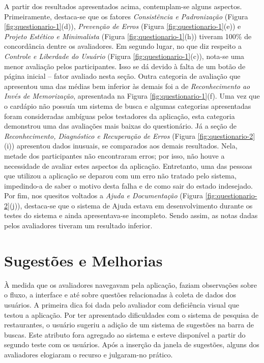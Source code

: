 A partir dos resultados apresentados acima, contemplam-se alguns aspectos. Primeiramente, destaca-se que os fatores \textit{Consistência e Padronização} (Figura \ref{fig:questionario-1}(d)), \textit{Prevenção de Erros} (Figura \ref{fig:questionario-1}(e)) e \textit{Projeto Estético e Minimalista} (Figura \ref{fig:questionario-1}(h)) tiveram 100\% de concordância dentre os avaliadores. Em segundo lugar, no que diz respeito a \textit{Controle e Liberdade do Usuário} (Figura \ref{fig:questionario-1}(c)), nota-se uma menor avaliação pelos participantes. Isso se dá devido à falta de um botão de página inicial -- fator avaliado nesta seção. Outra categoria de avaliação que apresentou uma das médias bem inferior às demais foi a de \textit{Reconhecimento ao Invés de Memorização}, apresentada na Figura \ref{fig:questionario-1}(f). Uma vez que o cardápio não possuía um sistema de busca e algumas categorias apresentadas foram consideradas ambíguas pelos testadores da aplicação, esta categoria demonstrou uma das avaliações mais baixas do questionário. Já a seção de \textit{Reconhecimento, Diagnóstico e Recuperação de Erros} (Figura \ref{fig:questionario-2}(i)) apresentou dados inusuais, se comparados aos demais resultados. Nela, metade dos participantes não encontraram erros; por isso, não houve a necessidade de avaliar estes aspectos da aplicação. Entretanto, uma das pessoas que utilizou a aplicação se deparou com um erro não tratado pelo sistema, impedindo-a de saber o motivo desta falha e de como sair do estado indesejado. Por fim, nos quesitos voltados a \textit{Ajuda e Documentação} (Figura \ref{fig:questionario-2}(j)), destaca-se que o sistema de Ajuda estava em desenvolvimento durante os testes do sistema e ainda apresentava-se incompleto. Sendo assim, as notas dadas pelos avaliadores tiveram um resultado inferior.

\section{\label{sec:sugestoes}Sugestões e Melhorias}

À medida que os avaliadores navegavam pela aplicação, faziam observações sobre o fluxo, a interface e até sobre questões relacionadas à coleta de dados dos usuários. A primeira dica foi dada pelo avaliador com deficiência visual que testou a aplicação. Por ter apresentado dificuldades com o sistema de pesquisa de restaurantes, o usuário sugeriu a adição de um sistema de sugestões na barra de buscas. Este atributo fora agregado ao sistema e esteve disponível a partir do segundo teste com os usuários. Após a inserção da janela de sugestões, alguns dos avaliadores elogiaram o recurso e julgaram-no prático.

